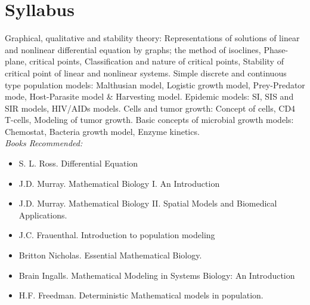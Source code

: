 \documentclass[../main-sheet.tex]{subfiles}
\begin{document}
\chapter*{Syllabus}
Graphical, qualitative and stability theory: Representations of solutions of linear and nonlinear differential equation by graphs; the method of isoclines, Phase-plane, critical points, Classification and nature of critical points, Stability of critical point of linear and nonlinear systems. Simple discrete and continuous type population models: Malthusian model, Logistic growth model, Prey-Predator mode, Host-Parasite model \& Harvesting model. Epidemic models: SI, SIS and SIR models, HIV/AIDs models. Cells and tumor growth: Concept of cells, CD4 T-cells, Modeling of tumor growth. Basic concepts of microbial growth models: Chemostat, Bacteria growth model, Enzyme kinetics.\\

\emph{Books Recommended:}
\begin{itemize}
    \item S. L. Ross. Differential Equation
    \item J.D. Murray. Mathematical Biology I. An Introduction
    \item J.D. Murray. Mathematical Biology II. Spatial Models and Biomedical Applications.
    \item J.C. Frauenthal. Introduction to population modeling
    \item Britton Nicholas. Essential Mathematical Biology.
    \item Brain Ingalls. Mathematical Modeling in Systems Biology: An Introduction
    \item H.F. Freedman. Deterministic Mathematical models in population.
\end{itemize}
\end{document}

